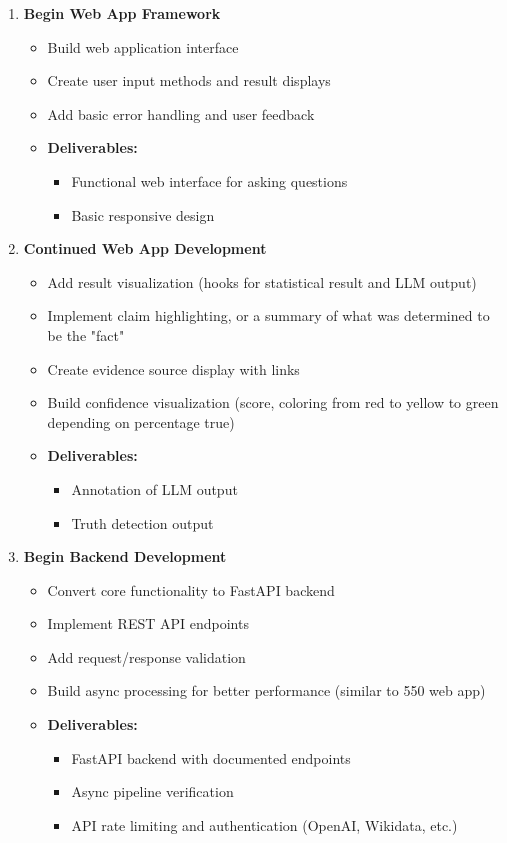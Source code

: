 \documentclass[11pt,letterpaper]{article}
\begin{document}
{\begin{enumerate}[label=\textbf{Week \arabic*:}]
    \item \textbf{Begin Web App Framework}
    \begin{itemize}[label=$\bullet$]
        \item Build web application interface
        \item Create user input methods and result displays
        \item Add basic error handling and user feedback
        \item \textbf{Deliverables:}
        \begin{itemize}[label=$\square$]
            \item Functional web interface for asking questions
            \item Basic responsive design
        \end{itemize}
    \end{itemize}

    \item \textbf{Continued Web App Development}
    \begin{itemize}[label=$\bullet$]
        \item Add result visualization (hooks for statistical result and LLM output)
        \item Implement claim highlighting, or a summary of what was determined to be the "fact"
        \item Create evidence source display with links
        \item Build confidence visualization (score, coloring from red to yellow to green depending on percentage true)
        \item \textbf{Deliverables:}
        \begin{itemize}[label=$\square$]
            \item Annotation of LLM output
            \item Truth detection output
        \end{itemize}
    \end{itemize}    

    \item \textbf{Begin Backend Development}
    \begin{itemize}[label=$\bullet$]
        \item Convert core functionality to FastAPI backend
        \item Implement REST API endpoints
        \item Add request/response validation
        \item Build async processing for better performance (similar to 550 web app)
        \item \textbf{Deliverables:}
        \begin{itemize}[label=$\square$]
            \item FastAPI backend with documented endpoints
            \item Async pipeline verification
            \item API rate limiting and authentication (OpenAI, Wikidata, etc.)
        \end{itemize}
    \end{itemize} 


\end{enumerate}}
\end{document}
